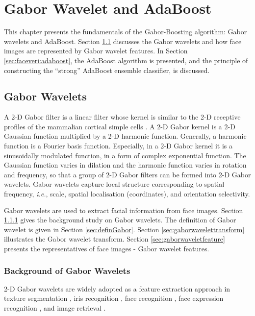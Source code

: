 \chapter{Gabor Wavelet and AdaBoost}
\label{ch:gaboradaboost}
This chapter presents the fundamentals of the Gabor-Boosting algorithm: Gabor wavelets and AdaBoost. \mbox{Section} \ref{sec:faceveri} discusses the Gabor wavelets and how face images are represented by Gabor wavelet features. In \mbox{Section} \ref{sec:faceveri:adaboost}, the AdaBoost algorithm is presented, and the principle of constructing the ``strong'' AdaBoost ensemble classifier, is discussed.
\section{Gabor Wavelets}
\label{sec:faceveri}
A 2-D Gabor filter is a linear filter whose kernel is similar to the 2-D receptive profiles of the mammalian cortical simple cells \cite{Jones1987}. A 2-D Gabor kernel is a 2-D Gaussian function multiplied by a 2-D harmonic function. Generally, a harmonic function is a Fourier basis function. Especially, in a 2-D Gabor kernel it is a sinusoidally modulated function, in a form of complex exponential function. The Gaussian function varies in dilation and the harmonic function varies in rotation and frequency, so that a group of 2-D Gabor filters can be formed into 2-D Gabor wavelets. Gabor wavelets capture local structure corresponding to spatial frequency, \textit{i.e.}, scale, spatial localisation (coordinates), and orientation selectivity.

Gabor wavelets are used to extract facial information from face images. \mbox{Section} \ref{sec:backgoundGabor} gives the background study on Gabor wavelets. The definition of Gabor wavelet is given in \mbox{Section} \ref{sec:definGabor}. \mbox{Section} \ref{sec:gaborwavelettransform} illustrates the Gabor wavelet transform. \mbox{Section} \ref{sec:gaborwaveletfeature} presents the representatives of face images - Gabor wavelet features.
\subsection{Background of Gabor Wavelets}
\label{sec:backgoundGabor}
2-D Gabor wavelets are widely adopted as a feature extraction approach in texture segmentation \cite{Dunn1994,Dunn1995,Jain1991,Teuner1995}, iris recognition \cite{Daugman1988}, face recognition \cite{Wiskott1997,Wiskott1999}, face expression recognition \cite{Hong1998,Lyons1999,Zhang1998}, and image retrieval \cite{Manjunath1996}.

